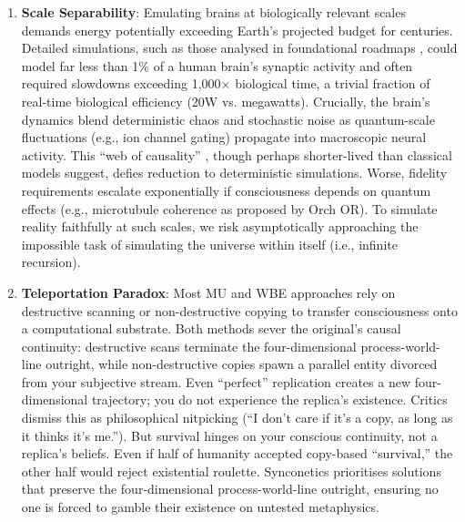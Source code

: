 \documentclass[10pt]{article}
\begin{document}
\begin{sloppypar}
\begin{enumerate}
    \item \textbf{Scale Separability}: Emulating brains at biologically relevant scales demands energy potentially exceeding Earth’s projected budget for centuries. Detailed simulations, such as those analysed in foundational roadmaps \citep{bostrom_whole_2008}, could model far less than 1\% of a human brain’s synaptic activity and often required slowdowns exceeding 1,000\(\times\) biological time, a trivial fraction of real-time biological efficiency (20W vs. megawatts). Crucially, the brain’s dynamics blend deterministic chaos and stochastic noise as quantum-scale fluctuations (e.g., ion channel gating) propagate into macroscopic neural activity. This “web of causality” \citep{watanabe_biological_2022}, though perhaps shorter-lived than classical models suggest, defies reduction to deterministic simulations. Worse, fidelity requirements escalate exponentially if consciousness depends on quantum effects (e.g., microtubule coherence as proposed by Orch OR). To simulate reality faithfully at such scales, we risk asymptotically approaching the impossible task of simulating the universe within itself (i.e., infinite recursion).

    \item \textbf{Teleportation Paradox}: Most MU and WBE approaches rely on destructive scanning or non-destructive copying to transfer consciousness onto a computational substrate. Both methods sever the original’s causal continuity: destructive scans terminate the four-dimensional process-world-line outright, while non-destructive copies spawn a parallel entity divorced from your subjective stream. Even “perfect” replication creates a new four-dimensional trajectory; you do not experience the replica’s existence. Critics dismiss this as philosophical nitpicking (“I don’t care if it’s a copy, as long as it thinks it’s me.”). But survival hinges on your conscious continuity, not a replica’s beliefs. Even if half of humanity accepted copy-based “survival,” the other half would reject existential roulette. Synconetics prioritises solutions that preserve the four-dimensional process-world-line outright, ensuring no one is forced to gamble their existence on untested metaphysics.
  \end{enumerate}


\end{sloppypar}
\end{document}
